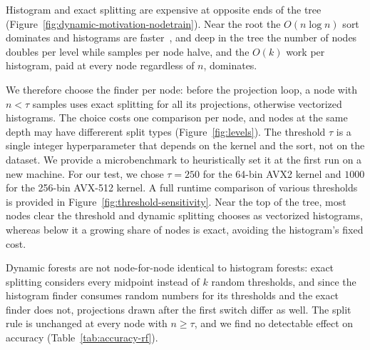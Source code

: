 \documentclass[sigconf]{acmart}%
\begin{document}
Histogram and exact splitting are expensive at opposite ends of the tree (Figure~\ref{fig:dynamic-motivation-nodetrain}). Near the root the $O(n\log n)$ sort dominates and histograms are faster~\cite{ydf,prokhorenkova2018catboost}, and deep in the tree the number of nodes doubles per level while samples per node halve, and the $O(k)$ work per histogram, paid at every node regardless of $n$, dominates.

We therefore choose the finder per node: before the projection loop, a node with $n<\tau$ samples uses exact splitting for all its projections, otherwise vectorized histograms. The choice costs one comparison per node, and nodes at the same depth may have differerent split types (Figure~\ref{fig:levels}). The threshold $\tau$ is a single integer hyperparameter that depends on the kernel and the sort, not on the dataset. We provide a microbenchmark to heuristically set it at the first run on a new machine. For our test, we chose $\tau=250$ for the 64-bin AVX2 kernel and $1000$ for the 256-bin AVX-512 kernel. A full runtime comparison of various thresholds is provided in Figure~\ref{fig:threshold-sensitivity}. Near the top of the tree, most nodes clear the threshold and dynamic splitting chooses as vectorized histograms, whereas below it a growing share of nodes is exact, avoiding the histogram's fixed cost.

Dynamic forests are not node-for-node identical to histogram forests: exact splitting considers every midpoint instead of $k$ random thresholds, and since the histogram finder consumes random numbers for its thresholds and the exact finder does not, projections drawn after the first switch differ as well. The split rule is unchanged at every node with $n\ge\tau$, and we find no detectable effect on accuracy (Table~\ref{tab:accuracy-rf}).





\end{document}
